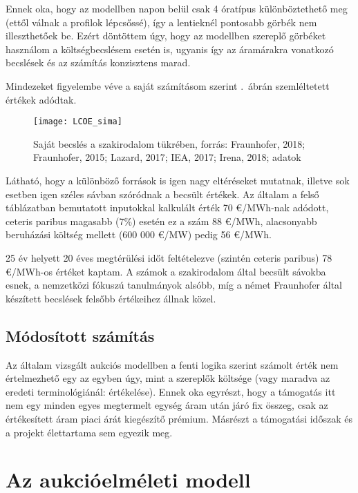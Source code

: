 \documentclass[twoside, magyar, showtrims]{corvinusphd}
\theoremstyle{plain}
\theoremstyle{remark}
\theoremstyle{definition}
\begin{document}
Ennek oka, hogy az  modellben napon belül csak 4 óratípus
különböztethető meg (ettől válnak a profilok lépcsőssé),
így a lentieknél pontosabb görbék nem illeszthetőek be.
Ezért döntöttem úgy, hogy az  modellben szereplő görbéket
használom a költségbecslésem esetén is,
ugyanis így az áramárakra vonatkozó becslések és
az  számítás konzisztens marad. 
\label{konz}

Mindezeket figyelembe véve a saját számításom szerint 
.~ábrán szemléltetett értékek adódtak.

\begin{figure}
    \centering
    \texttt{[image: LCOE\_sima]}
    \caption{Saját  becslés a szakirodalom tükrében, forrás: Fraunhofer, 2018; Fraunhofer, 2015; Lazard, 2017; IEA, 2017; Irena, 2018;  adatok}
    \label{fig:sajat}
\end{figure}

Látható, hogy a különböző források is igen nagy eltéréseket mutatnak,
illetve sok esetben igen széles sávban szóródnak a becsült értékek.
Az általam a felső táblázatban bemutatott inputokkal kalkulált érték
70 €/MWh-nak adódott, ceteris paribus magasabb
 (7\%) esetén ez a szám 88 €/MWh,
alacsonyabb beruházási költség mellett (600 000 €/MW) pedig 56 €/MWh. 

25 év helyett 20 éves megtérülési időt feltételezve (szintén ceteris paribus)
78 €/MWh-os  értéket kaptam.
A számok a szakirodalom által becsült sávokba esnek,
a nemzetközi fókuszú tanulmányok alsóbb, míg a német Fraunhofer által
készített becslések felsőbb értékeihez állnak közel.


\section{Módosított  számítás}

Az általam vizsgált aukciós modellben a fenti logika szerint számolt
 érték nem értelmezhető egy az egyben úgy,
mint a szereplők költsége (vagy maradva az eredeti terminológiánál: értékelése).
Ennek oka egyrészt, hogy a támogatás itt nem egy minden egyes
megtermelt egység áram után járó fix összeg,
csak az értékesített áram piaci árát kiegészítő prémium.
Másrészt a támogatási időszak és a projekt élettartama sem egyezik meg. 

\chapter{Az aukcióelméleti modell}
\end{document}

